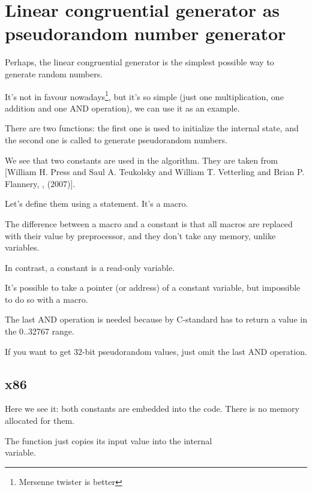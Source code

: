 \section[Linear congruential generator]{Linear congruential generator as pseudorandom number generator}
\label{LCG_simple}

Perhaps, the linear congruential generator is the simplest possible way to generate random numbers.

It's not in favour nowadays\footnote{Mersenne twister is better}, but it's so simple 
(just one multiplication, one addition and one AND operation), 
we can use it as an example.



There are two functions: the first one is used to initialize the internal state, and the second one is called
to generate pseudorandom numbers.

We see that two constants are used in the algorithm.
They are taken from
[William H. Press and Saul A. Teukolsky and William T. Vetterling and Brian P. Flannery, , (2007)].

Let's define them using a  \CCpp statement. It's a macro.

The difference between a \CCpp macro and a constant is that all macros are replaced 
with their value by \CCpp preprocessor,
and they don't take any memory, unlike variables.

In contrast, a constant is a read-only variable.

It's possible to take a pointer (or address) of a constant variable, but impossible to do so with a macro.

The last AND operation is needed because by C-standard  has to return a value in 
the 0..32767 range.

If you want to get 32-bit pseudorandom values, just omit the last AND operation.

\subsection{x86}



Here we see it: both constants are embedded into the code.
There is no memory allocated for them.

The  function just copies its input value into the internal\\
 variable.


